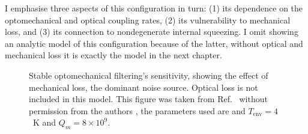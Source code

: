 I emphasise three aspects of this configuration in turn: (1) its dependence on the optomechanical and optical coupling rates, (2) its vulnerability to mechanical loss, and (3) its connection to nondegenerate internal squeezing. I omit showing an analytic model of this configuration because of the latter, without optical and mechanical loss it is exactly the model in the next chapter. %

\begin{figure}
	\centering
	\caption{ Stable optomechanical filtering's sensitivity, showing the effect of mechanical loss, the dominant noise source. Optical loss is not included in this model. This figure was taken from Ref.~\cite{} without permission from the authors , the parameters used are  and $T_\text{env}=4$~K and $Q_m=8\times10^9$.}
	\label{fig:sWLC_sensitivity}
\end{figure}


